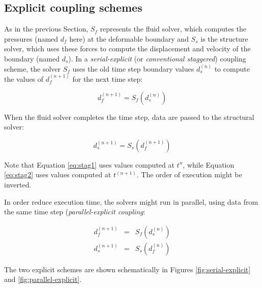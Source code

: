 \subsection{Explicit coupling schemes}

As in the previous Section, $S_f$ represents the fluid solver, which computes the pressures (named $d_f$ here) at the deformable boundary and $S_s$ is the structure solver, which uses these forces to compute the displacement and velocity of the boundary (named $d_s$). In a \textit{serial-explicit} (or \textit{conventional staggered}) coupling scheme, the solver $S_f$ uses the old time step boundary values $d_s^{(n)}$ to compute the values of $d_f^{(n+1)}$ for the next time step:

\begin{equation}
	d_f^{(n+1)} = S_f\left(d_s^{(n)}\right)
	\label{eq:stag1}
\end{equation}

When the fluid solver completes the time step, data are passed to the structural solver:

\begin{equation}
	d_s^{(n+1)} = S_s\left( d_f^{(n+1)} \right)
	\label{eq:stag2}
\end{equation}

Note that Equation \ref{eq:stag1} uses values computed at $t^n$, while Equation \ref{eq:stag2} uses values computed at $t^{(n+1)}$. The order of execution might be inverted.

In order reduce execution time, the solvers might run in parallel, using data from the same time step (\textit{parallel-explicit coupling}:

\begin{subequations}
\begin{eqnarray}
	d_f^{(n+1)} &=& S_f\left(d_s^{(n)}\right) \\
	d_s^{(n+1)} &=& S_s\left( d_f^{(n)} \right)
	\label{eq:par-exp}
\end{eqnarray} 
\end{subequations}


The two explicit schemes are shown schematically in Figures \ref{fig:serial-explicit} and \ref{fig:parallel-explicit}.

